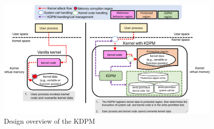 \begin{figure}[tb]
  \hspace{10.0ex}
  \includegraphics[bb=0 0 1587 852, scale=.290]{./imgs/003_screenshot_2021-07-27_19.37.39.png}
  \caption{
    Design overview of the KDPM
  }
 \label{fig:design_overview}
\end{figure}


